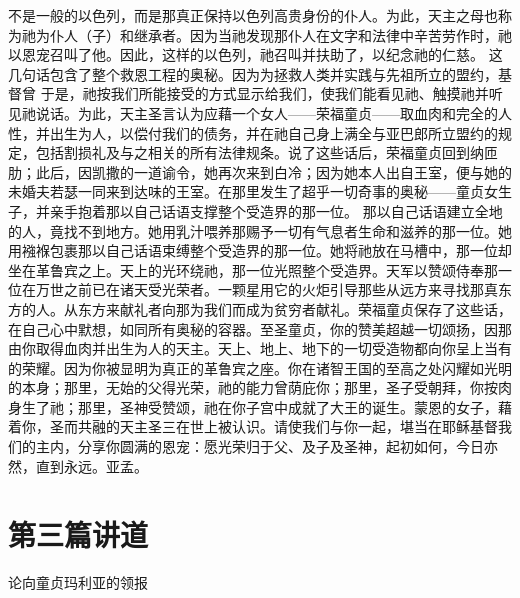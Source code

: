 不是一般的以色列，而是那真正保持以色列高贵身份的仆人。为此，天主之母也称为祂为仆人（子）和继承者。因为当祂发现那仆人在文字和法律中辛苦劳作时，祂以恩宠召叫了他。因此，这样的以色列，祂召叫并扶助了，以纪念祂的仁慈。 这几句话包含了整个救恩工程的奥秘。因为为拯救人类并实践与先祖所立的盟约，基督曾 于是，祂按我们所能接受的方式显示给我们，使我们能看见祂、触摸祂并听见祂说话。为此，天主圣言认为应藉一个女人——荣福童贞——取血肉和完全的人性，并出生为人，以偿付我们的债务，并在祂自己身上满全与亚巴郎所立盟约的规定，包括割损礼及与之相关的所有法律规条。说了这些话后，荣福童贞回到纳匝肋；此后，因凯撒的一道谕令，她再次来到白冷；因为她本人出自王室，便与她的未婚夫若瑟一同来到达味的王室。在那里发生了超乎一切奇事的奥秘——童贞女生子，并亲手抱着那以自己话语支撑整个受造界的那一位。 那以自己话语建立全地的人，竟找不到地方。她用乳汁喂养那赐予一切有气息者生命和滋养的那一位。她用襁褓包裹那以自己话语束缚整个受造界的那一位。她将祂放在马槽中，那一位却坐在革鲁宾之上。天上的光环绕祂，那一位光照整个受造界。天军以赞颂侍奉那一位在万世之前已在诸天受光荣者。一颗星用它的火炬引导那些从远方来寻找那真东方的人。从东方来献礼者向那为我们而成为贫穷者献礼。荣福童贞保存了这些话，在自己心中默想，如同所有奥秘的容器。至圣童贞，你的赞美超越一切颂扬，因那由你取得血肉并出生为人的天主。天上、地上、地下的一切受造物都向你呈上当有的荣耀。因为你被显明为真正的革鲁宾之座。你在诸智王国的至高之处闪耀如光明的本身；那里，无始的父得光荣，祂的能力曾荫庇你；那里，圣子受朝拜，你按肉身生了祂；那里，圣神受赞颂，祂在你子宫中成就了大王的诞生。蒙恩的女子，藉着你，圣而共融的天主圣三在世上被认识。请使我们与你一起，堪当在耶稣基督我们的主内，分享你圆满的恩宠：愿光荣归于父、及子及圣神，起初如何，今日亦然，直到永远。亚孟。\par



\section{第三篇讲道}

论向童贞玛利亚的领报\par

